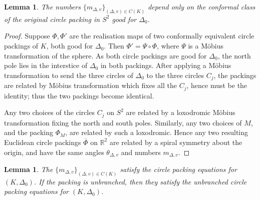 \documentclass[12pt]{amsart}
\numberwithin{equation}{section}
\newtheorem{lem}[equation]{Lemma}
\theoremstyle{named}
\newcommand{\R}{\mathbb{R}}
\begin{document}
\begin{lem}
The numbers $\{m_{\Delta,v}\}_{(\Delta, v) \in C(K)}$ depend only on the conformal class of the original circle packing in $S^2$ good for $\Delta_0$.

\end{lem}

\begin{proof}
Suppose $\Phi, \Phi'$ are the realisation maps of two conformally equivalent circle packings of $K$, both good for $\Delta_0$. Then $\Phi' = \Psi \circ \Phi$, where $\Psi$ is a M\"{o}bius transformation of the sphere. As both circle packings are good for $\Delta_0$, the north pole lies in the interstice of $\Delta_0$ in both packings. After applying a M\"{o}bius transformation to send the three circles of $\Delta_0$ to the three circles $C_j$, the packings are related by M\"{o}bius transformation which fixes all the $C_j$, hence must be the identity; thus the two packings become identical.

Any two choices of the circles $C_j$ on $S^2$ are related by a loxodromic M\"{o}bius transformation fixing the north and south poles. Similarly, any two choices of $M$, and the packing $\Phi_M$, are related by such a loxodromic. Hence any two resulting Euclidean circle packings $\overline{\Phi}$ on $\R^2$ are related by a spiral symmetry about the origin, and have the same angles $\theta_{\Delta,v}$ and numbers $m_{\Delta,v}$.
\end{proof}

\begin{lem}
The $\{m_{\Delta,v}\}_{(\Delta, v) \in C(K)}$ satisfy the circle packing equations for $(K, \Delta_0)$. If the packing is unbranched, then they satisfy the unbranched circle packing equations for $(K, \Delta_0)$.
\end{lem}
\end{document}
